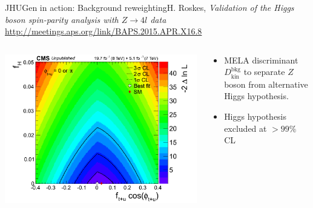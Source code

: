\documentclass[usenames,dvipsnames,svgnames,table]{beamer}
\begin{document}
\begin{frame}{JHUGen in action: Background reweighting}{H. Roskes, \emph{Validation of the Higgs boson spin-parity
analysis with $Z\to 4l$ data}\\ \url{http://meetings.aps.org/link/BAPS.2015.APR.X16.8}}
\begin{columns}
\begin{column}{0.55\textwidth}
\includegraphics[height=\the\imageheight]{HVV/Z4l2dscan}
\end{column}
\begin{column}{0.45\textwidth}
\begin{itemize}
\item MELA discriminant $D^\text{bkg}_\text{kin}$ to separate $Z$ boson from alternative Higgs hypothesis.
\item Higgs hypothesis excluded at $>99\%$ CL
\end{itemize}
\end{column}
\end{columns}
\end{frame}
\end{document}
